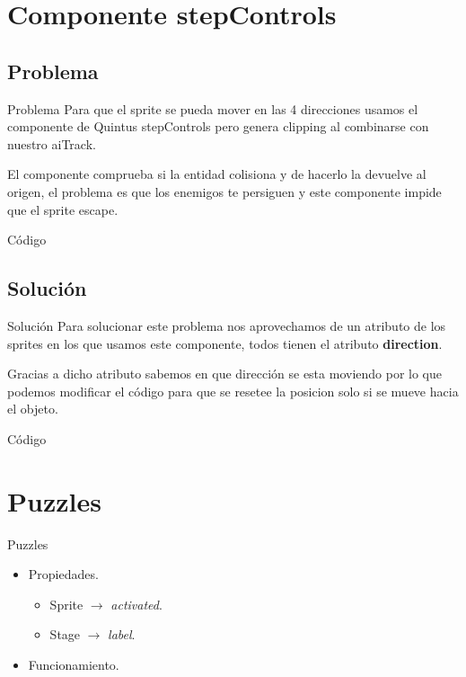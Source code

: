 \documentclass{beamer}
\begin{document}
\section{Componente stepControls}

\subsection{Problema}

\begin{frame}{Problema}
	Para que el sprite se pueda mover en las 4 direcciones usamos el componente
	de Quintus stepControls pero genera clipping al combinarse con nuestro aiTrack.

	\medskip

	El componente comprueba si la entidad colisiona y de hacerlo la devuelve al
	origen, el problema es que los enemigos te persiguen y este componente impide
	que el sprite escape.
\end{frame}

\begin{frame}{Código}
	
\end{frame}

\subsection{Solución}

\begin{frame}{Solución}
	Para solucionar este problema nos aprovechamos de un atributo de los
	sprites en los que usamos este componente, todos tienen el atributo
	\textbf{direction}.

	\medskip

	Gracias a dicho atributo sabemos en que dirección se esta moviendo por lo que
	podemos modificar el código para que se resetee la posicion solo si se mueve
	hacia el objeto.
\end{frame}

\begin{frame}{Código}
	
\end{frame}

\section{Puzzles}

\begin{frame}{Puzzles}
	\begin{itemize}
		\item Propiedades.
		      \begin{itemize}
			      \item Sprite $\rightarrow$ \textit{activated}.
			      \item Stage $\rightarrow$ \textit{label}.
		      \end{itemize}
		\item Funcionamiento.
	\end{itemize}
\end{frame}
\end{document}
